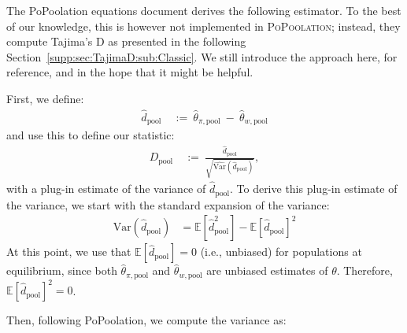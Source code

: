 \documentclass[letterpaper,fontsize=9pt,DIV=12]{scrartcl}
\newcommand\toolname{\textsc}
\newcommand\secref[1]{Section~\ref{#1}}
\begin{document}
The PoPoolation equations document derives the following estimator.
To the best of our knowledge, this is however not implemented in \toolname{PoPoolation};
instead, they compute Tajima's D as presented in the following \secref{supp:sec:TajimaD:sub:Classic}.
We still introduce the approach here, for reference, and in the hope that it might be helpful.

First, we define:
%
\begin{align}
    \widehat{d}_\text{pool} ~&:=~ \widehat{\theta}_{\pi,\text{pool}} ~-~ \widehat{\theta}_{w, \text{pool}}
\end{align}
%
and use this to define our statistic:
%
\begin{align}
    \label{eq:BasicTajimaD}
    D_\text{pool} ~&:=~ \frac{ \widehat{d}_\text{pool} }{ \sqrt{ \widehat{\text{Var}}( \widehat{d}_\text{pool}) }},
\end{align}
%
with a plug-in estimate of the variance of $ \widehat{d}_\text{pool}$.
To derive this plug-in estimate of the variance, we start with the standard expansion of the variance:
%
\begin{align}
    \nonumber
    \text{Var}( \widehat{d}_\text{pool} ) &= \mathbb{E}\left[ \widehat{d}_\text{pool}^2 \right] - \mathbb{E}\left[\widehat{d}_\text{pool}\right]^2
\end{align}
%
At this point, we use that $\mathbb{E}[\widehat{d}_\text{pool}] = 0$ (i.e., unbiased) for populations at equilibrium, since both $\widehat{\theta}_{\pi,\text{pool}}$ and $\widehat{\theta}_{w, \text{pool}}$ are unbiased estimates of $\theta$.  Therefore, $\mathbb{E}[\widehat{d}_\text{pool}]^2 = 0$.

Then, following PoPoolation, we compute the variance as:
\end{document}

